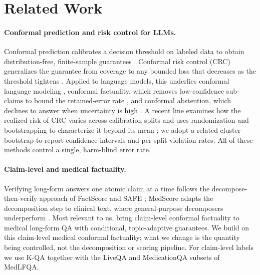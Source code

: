 
\section{Related Work}
\label{sec:related}

\paragraph{Conformal prediction and risk control for LLMs.}
Conformal prediction calibrates a decision threshold on labeled data to obtain
distribution-free, finite-sample guarantees
\citep{vovk2005algorithmic,angelopoulos2023gentle}. Conformal risk control
(CRC) generalizes the guarantee from coverage to any bounded loss that
decreases as the threshold tightens \citep{angelopoulos2024crc}. Applied to
language models, this underlies conformal language modeling
\citep{quach2024conformal}, conformal factuality, which removes low-confidence
sub-claims to bound the retained-error rate \citep{mohri2024conformal}, and
conformal abstention, which declines to answer when uncertainty is high
\citep{abbasiyadkori2024conformal}. A recent line examines how the realized
risk of CRC varies across calibration splits and uses randomization and
bootstrapping to characterize it beyond its mean \citep{pang2025bootstrap}; we
adopt a related cluster bootstrap to report confidence intervals and per-split
violation rates. All of these methods control a single, harm-blind error rate.

\paragraph{Claim-level and medical factuality.}
Verifying long-form answers one atomic claim at a time follows the
decompose-then-verify approach of FactScore \citep{min2023factscore} and SAFE
\citep{wei2024safe}; MedScore adapts the decomposition step to clinical text,
where general-purpose decomposers underperform \citep{huang2025medscore}. Most
relevant to us, \citet{cherian2024llm} bring claim-level conformal factuality to
medical long-form QA with conditional, topic-adaptive guarantees. We build on
this claim-level medical conformal factuality; what we change is the quantity
being controlled, not the decomposition or scoring pipeline. For claim-level
labels we use K-QA \citep{manes2024kqa} together with the LiveQA and MedicationQA
subsets of MedLFQA.

